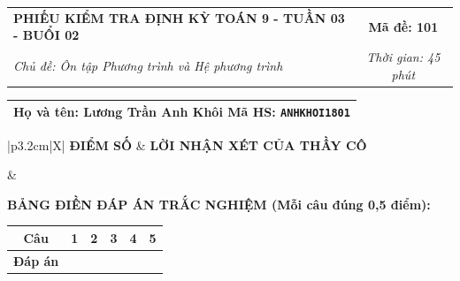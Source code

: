 \documentclass[12pt,a4paper]{article}
\begin{document}
\newpage



\noindent
\begin{tabularx}{\linewidth}{|X|c|}
\hline
\textbf{PHIẾU KIỂM TRA ĐỊNH KỲ TOÁN 9 - TUẦN 03 - BUỔI 02} & \textbf{Mã đề: 101} \\
\textit{Chủ đề: Ôn tập Phương trình và Hệ phương trình} & \textit{Thời gian: 45 phút} \\
\hline
\end{tabularx}

\vspace{1mm}

\noindent
\begin{tabularx}{\linewidth}{|X|}
\hline
\rule[-2mm]{0pt}{7.5mm}\textbf{Họ và tên:} \textbf{\large Lương Trần Anh Khôi} \hfill \textbf{Mã HS:} \texttt{ANHKHOI1801} \quad \\
\hline
\end{tabularx}

\vspace{1mm}

\noindent
\begin{tabularx}{\linewidth}{|p{3.2cm}|X|}
\hline
\centering\textbf{ĐIỂM SỐ} & \centering\textbf{LỜI NHẬN XÉT CỦA THẦY CÔ} \tabularnewline
\hline
\rule{0pt}{1.3cm} & \tabularnewline
\hline
\end{tabularx}

\vspace{1.2mm}

\noindent\textbf{BẢNG ĐIỀN ĐÁP ÁN TRẮC NGHIỆM (Mỗi câu đúng 0,5 điểm):}
\vspace{0.8mm}

\noindent
\renewcommand{\arraystretch}{1.35}
\begin{tabularx}{\linewidth}{|c|*{5}{>{\centering\arraybackslash}X|}}
\hline
\textbf{Câu} & \textbf{1} & \textbf{2} & \textbf{3} & \textbf{4} & \textbf{5} \\
\hline
\textbf{Đáp án} & & & & & \\
\hline
\end{tabularx}
\renewcommand{\arraystretch}{1.0}

\vspace{1.5mm}
\end{document}
